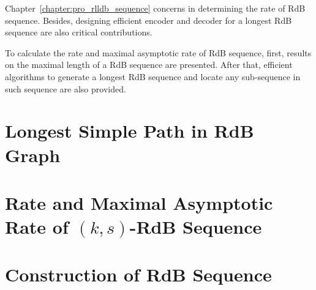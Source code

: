 Chapter~\ref{chapter:pro_rlldb_sequence} concerns in determining the rate of \gls{RdB} sequence. Besides, designing efficient encoder and decoder for a longest \gls{RdB} sequence are also critical contributions. 

To calculate the rate and maximal asymptotic rate of \gls{RdB} sequence, first, results on the maximal length of a \gls{RdB} sequence are presented. After that, efficient algorithms to generate a longest RdB sequence and locate any sub-sequence in such sequence are also provided.

\section{Longest Simple Path in RdB Graph}\label{sec:graph_representation}


\section{Rate and Maximal Asymptotic Rate of \texorpdfstring{$(k,s)$}{(k,s)}-RdB Sequence}\label{sec:rate}


\section{Construction of RdB Sequence}\label{sec:construction}







